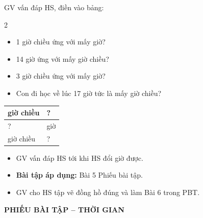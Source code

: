 \documentclass[../main.tex]{subfiles}
\begin{document}
\begin{vd}
    GV vấn đáp HS, điền vào bảng:
    \begin{multicols}{2}
        \begin{itemize}
            \item 1 giờ chiều ứng với mấy giờ?
            \item 14 giờ ứng với mấy giờ chiều?
            \item 3 giờ chiều ứng với mấy giờ?
            \item Con đi học về lúc 17 giờ tức là mấy giờ chiều?
        \end{itemize}
    \end{multicols}
    \begin{center}
        \renewcommand{\arraystretch}{1.5}
        \begin{tabular}{|>{\centering\arraybackslash}p{4.5cm}|>{\centering\arraybackslash}p{4.5cm}|}
            \hline
            1 giờ chiều & ? \\ \hline
            ? & 14 giờ \\ \hline
            3 giờ chiều & ? \\ \hline
        \end{tabular}
    \end{center}
\end{vd}
\begin{itemize}
    \item GV vấn đáp HS tới khi HS đổi giờ được.
    \item \textbf{Bài tập áp dụng:} Bài 5 Phiếu bài tập.
    \item GV cho HS tập vẽ đồng hồ đúng và làm Bài 6 trong PBT.
\end{itemize}

\begin{center}
    {\color{mauchinh}\bfseries PHIẾU BÀI TẬP -- THỜI GIAN}
\end{center}
\end{document}

